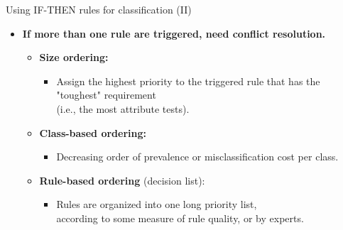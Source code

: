 \documentclass[aspectratio=169,t,table]{beamer}
\begin{document}
  {
    \begin{frame}{Using \uppercase{if-then} rules for classification (II)}
      \begin{itemize}
        \item \textbf{If more than one rule are triggered, need {\color{airforceblue}conflict resolution}.}
        \begin{itemize}
          \item \textbf{\color{airforceblue}Size ordering:}
          \begin{itemize}
            \item Assign the highest priority to the triggered rule that has the "toughest" requirement \\ (i.e., the most attribute tests).
          \end{itemize}
          \item \textbf{\color{airforceblue}Class-based ordering:}
          \begin{itemize}
            \item Decreasing order of prevalence or misclassification cost per class.
          \end{itemize}
        \item \textbf{\color{airforceblue}Rule-based ordering} (decision list):
        \begin{itemize}
          \item Rules are organized into one long priority list,\\
          according to some measure of rule quality, or by experts.
        \end{itemize}
      \end{itemize}
      \end{itemize}
    \end{frame}
  }
\end{document}
